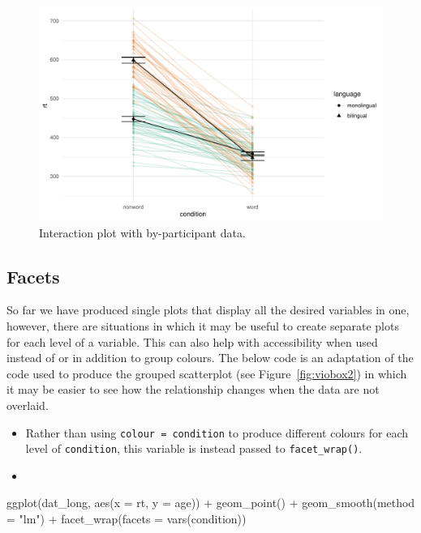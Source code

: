 \documentclass[
  english,
  doc,floatsintext]{apa6}
\newenvironment{Shaded}{\begin{snugshade}}{\end{snugshade}}
\newcommand{\AttributeTok}[1]{\textcolor[rgb]{0.77,0.63,0.00}{#1}}
\newcommand{\FunctionTok}[1]{\textcolor[rgb]{0.00,0.00,0.00}{#1}}
\newcommand{\NormalTok}[1]{#1}
\newcommand{\SpecialCharTok}[1]{\textcolor[rgb]{0.00,0.00,0.00}{#1}}
\newcommand{\StringTok}[1]{\textcolor[rgb]{0.31,0.60,0.02}{#1}}
\providecommand{\tightlist}{%
  \setlength{\itemsep}{0pt}\setlength{\parskip}{0pt}}
\begin{document}
\begin{figure}

{\centering \includegraphics[width=1\linewidth]{images/ixn-by-subj-1} 

}

\caption{Interaction plot with by-participant data.}\label{fig:ixn-by-subj}
\end{figure}

\hypertarget{facets}{%
\subsection{Facets}\label{facets}}

So far we have produced single plots that display all the desired variables in one, however, there are situations in which it may be useful to create separate plots for each level of a variable. This can also help with accessibility when used instead of or in addition to group colours. The below code is an adaptation of the code used to produce the grouped scatterplot (see Figure~\ref{fig:viobox2}) in which it may be easier to see how the relationship changes when the data are not overlaid.

\begin{itemize}
\tightlist
\item
  Rather than using \texttt{colour\ =\ condition} to produce different colours for each level of \texttt{condition}, this variable is instead passed to \texttt{facet\_wrap()}.
\item
\end{itemize}

\begin{Shaded}
\begin{Highlighting}[]
\FunctionTok{ggplot}\NormalTok{(dat\_long, }\FunctionTok{aes}\NormalTok{(}\AttributeTok{x =}\NormalTok{ rt, }\AttributeTok{y =}\NormalTok{ age)) }\SpecialCharTok{+}
  \FunctionTok{geom\_point}\NormalTok{() }\SpecialCharTok{+}
  \FunctionTok{geom\_smooth}\NormalTok{(}\AttributeTok{method =} \StringTok{"lm"}\NormalTok{) }\SpecialCharTok{+}
  \FunctionTok{facet\_wrap}\NormalTok{(}\AttributeTok{facets =} \FunctionTok{vars}\NormalTok{(condition))}
\end{Highlighting}
\end{Shaded}
\end{document}
